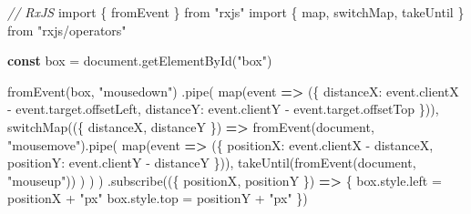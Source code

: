 \documentclass[
]{article}
\newenvironment{Shaded}{}{}
\newcommand{\AttributeTok}[1]{\textcolor[rgb]{0.49,0.56,0.16}{#1}}
\newcommand{\BuiltInTok}[1]{#1}
\newcommand{\CommentTok}[1]{\textcolor[rgb]{0.38,0.63,0.69}{\textit{#1}}}
\newcommand{\DataTypeTok}[1]{\textcolor[rgb]{0.56,0.13,0.00}{#1}}
\newcommand{\FunctionTok}[1]{\textcolor[rgb]{0.02,0.16,0.49}{#1}}
\newcommand{\ImportTok}[1]{#1}
\newcommand{\KeywordTok}[1]{\textcolor[rgb]{0.00,0.44,0.13}{\textbf{#1}}}
\newcommand{\NormalTok}[1]{#1}
\newcommand{\OperatorTok}[1]{\textcolor[rgb]{0.40,0.40,0.40}{#1}}
\newcommand{\StringTok}[1]{\textcolor[rgb]{0.25,0.44,0.63}{#1}}
\begin{document}
\begin{Shaded}
\begin{Highlighting}[]
\CommentTok{// RxJS}
\ImportTok{import}\NormalTok{ \{ fromEvent \} }\ImportTok{from} \StringTok{"rxjs"}
\ImportTok{import}\NormalTok{ \{ map}\OperatorTok{,}\NormalTok{ switchMap}\OperatorTok{,}\NormalTok{ takeUntil \} }\ImportTok{from} \StringTok{"rxjs/operators"}

\KeywordTok{const}\NormalTok{ box }\OperatorTok{=} \BuiltInTok{document}\OperatorTok{.}\FunctionTok{getElementById}\NormalTok{(}\StringTok{"box"}\NormalTok{)}

\FunctionTok{fromEvent}\NormalTok{(box}\OperatorTok{,} \StringTok{"mousedown"}\NormalTok{)}
  \OperatorTok{.}\FunctionTok{pipe}\NormalTok{(}
    \FunctionTok{map}\NormalTok{(}\BuiltInTok{event} \KeywordTok{=\textgreater{}}\NormalTok{ (\{}
      \DataTypeTok{distanceX}\OperatorTok{:} \BuiltInTok{event}\OperatorTok{.}\AttributeTok{clientX} \OperatorTok{{-}} \BuiltInTok{event}\OperatorTok{.}\AttributeTok{target}\OperatorTok{.}\AttributeTok{offsetLeft}\OperatorTok{,}
      \DataTypeTok{distanceY}\OperatorTok{:} \BuiltInTok{event}\OperatorTok{.}\AttributeTok{clientY} \OperatorTok{{-}} \BuiltInTok{event}\OperatorTok{.}\AttributeTok{target}\OperatorTok{.}\AttributeTok{offsetTop}
\NormalTok{    \}))}\OperatorTok{,}
    \FunctionTok{switchMap}\NormalTok{((\{ distanceX}\OperatorTok{,}\NormalTok{ distanceY \}) }\KeywordTok{=\textgreater{}}
      \FunctionTok{fromEvent}\NormalTok{(}\BuiltInTok{document}\OperatorTok{,} \StringTok{"mousemove"}\NormalTok{)}\OperatorTok{.}\FunctionTok{pipe}\NormalTok{(}
        \FunctionTok{map}\NormalTok{(}\BuiltInTok{event} \KeywordTok{=\textgreater{}}\NormalTok{ (\{}
          \DataTypeTok{positionX}\OperatorTok{:} \BuiltInTok{event}\OperatorTok{.}\AttributeTok{clientX} \OperatorTok{{-}}\NormalTok{ distanceX}\OperatorTok{,}
          \DataTypeTok{positionY}\OperatorTok{:} \BuiltInTok{event}\OperatorTok{.}\AttributeTok{clientY} \OperatorTok{{-}}\NormalTok{ distanceY}
\NormalTok{        \}))}\OperatorTok{,}
        \FunctionTok{takeUntil}\NormalTok{(}\FunctionTok{fromEvent}\NormalTok{(}\BuiltInTok{document}\OperatorTok{,} \StringTok{"mouseup"}\NormalTok{))}
\NormalTok{      )}
\NormalTok{    )}
\NormalTok{  )}
  \OperatorTok{.}\FunctionTok{subscribe}\NormalTok{((\{ positionX}\OperatorTok{,}\NormalTok{ positionY \}) }\KeywordTok{=\textgreater{}}\NormalTok{ \{}
\NormalTok{    box}\OperatorTok{.}\AttributeTok{style}\OperatorTok{.}\AttributeTok{left} \OperatorTok{=}\NormalTok{ positionX }\OperatorTok{+} \StringTok{"px"}
\NormalTok{    box}\OperatorTok{.}\AttributeTok{style}\OperatorTok{.}\AttributeTok{top} \OperatorTok{=}\NormalTok{ positionY }\OperatorTok{+} \StringTok{"px"}
\NormalTok{  \})}
\end{Highlighting}
\end{Shaded}
\end{document}
